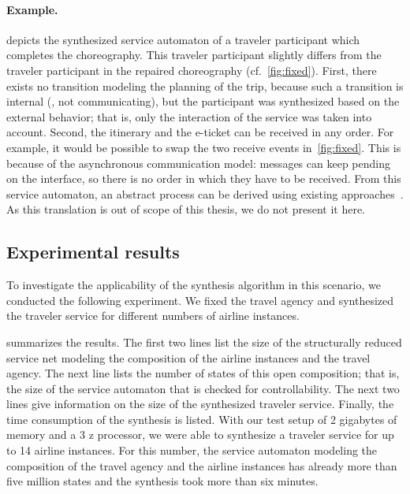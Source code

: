 \paragraph{Example.}

 depicts the synthesized service automaton of a traveler participant which completes the choreography. This traveler participant slightly differs from the traveler participant in the repaired choreography (cf.~\autoref{fig:fixed}). First, there exists no transition modeling the planning of the trip, because such a transition is internal (\ie, not communicating), but the participant was synthesized based on the external behavior; that is, only the interaction of the service was taken into account. Second, the itinerary and the e-ticket can be received in any order. For example, it would be possible to swap the two receive events in~\autoref{fig:fixed}. This is because of the asynchronous communication model: messages can keep pending on the interface, so there is no order in which they have to be received. From this service automaton, an abstract  process can be derived using existing approaches~\cite{LassenA_2006_otm,AalstL_2008_ist,LohmannK_2008_mod}. As this translation is out of scope of this thesis, we do not present it here.




\subsection*{Experimental results}

To investigate the applicability of the synthesis algorithm in this scenario, we conducted the following experiment. We fixed the travel agency and synthesized the traveler service for different numbers of airline instances.

 summarizes the results. The first two lines list the size of the structurally reduced service net modeling the composition of the airline instances and the travel agency. The next line lists the number of states of this open composition; that is, the size of the service automaton that is checked for controllability. The next two lines give information on the size of the synthesized traveler service. Finally, the time consumption of the synthesis is listed. With our test setup of 2 gigabytes of memory and a 3 z processor, we were able to synthesize a traveler service for up to 14 airline instances. For this number, the service automaton modeling the composition of the travel agency and the airline instances has already more than five million states and the synthesis took more than six minutes.

